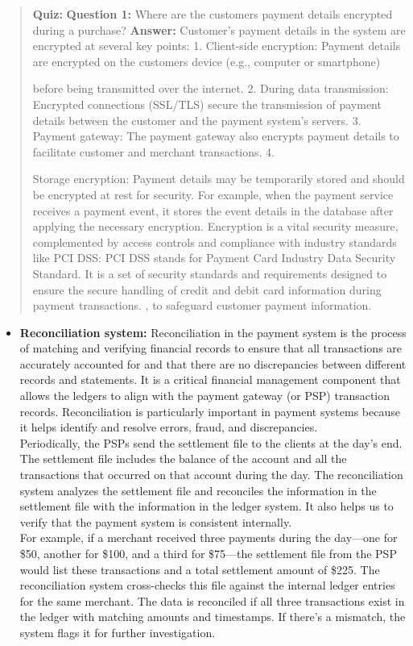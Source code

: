 \begin{quote}
\textbf{Quiz:}
\textbf{Question 1:} Where are the customer\textquotesingle s payment details encrypted during a purchase?
\textbf{Answer:} Customer's payment details in the system are encrypted at several key points: 1. Client-side encryption: Payment details are encrypted on the customer\textquotesingle s device (e.g., computer or smartphone)

before being transmitted over the internet. 2. During data transmission: Encrypted connections (SSL/TLS) secure the transmission of payment details between the customer and the payment system's servers. 3. Payment gateway: The payment gateway also encrypts payment details to facilitate customer and merchant transactions. 4.

Storage encryption: Payment details may be temporarily stored and should be encrypted at rest for security. For example, when the payment service receives a payment event, it stores the event details in the database after applying the necessary encryption. Encryption is a vital security measure, complemented by access controls and compliance with industry standards like  PCI DSS: PCI DSS stands for Payment Card Industry Data Security Standard. It is a set of security standards and requirements designed to ensure the secure handling of credit and debit card information during payment transactions. , to safeguard customer payment information.
\end{quote}

\begin{itemize}
\item
\protect{}\label{kpXGDPsWYQBGbvwvo6LMy}
\textbf{Reconciliation system:} Reconciliation in the payment system is the process of matching and verifying financial records to ensure that all transactions are accurately accounted for and that there are no discrepancies between different records and statements. It is a critical financial management component that allows the ledgers to align with the payment gateway (or PSP) transaction records. Reconciliation is particularly important in payment systems because it helps identify and resolve errors, fraud, and discrepancies.\\
Periodically, the PSPs send the settlement file to the clients at the day's end. The settlement file includes the balance of the account and all the transactions that occurred on that account during the day. The reconciliation system analyzes the settlement file and reconciles the information in the settlement file with the information in the ledger system. It also helps us to verify that the payment system is consistent internally.\\
For example, if a merchant received three payments during the day---one for \$50, another for \$100, and a third for \$75---the settlement file from the PSP would list these transactions and a total settlement amount of \$225. The reconciliation system cross-checks this file against the internal ledger entries for the same merchant. The data is reconciled if all three transactions exist in the ledger with matching amounts and timestamps. If there's a mismatch, the system flags it for further investigation.
\end{itemize}

